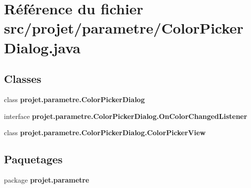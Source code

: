 \section{\-Référence du fichier src/projet/parametre/\-Color\-Picker\-Dialog.java}
\label{_color_picker_dialog_8java}
\subsection*{\-Classes}
\begin{DoxyCompactItemize}
\item 
class {\bf projet.\-parametre.\-Color\-Picker\-Dialog}
\item 
interface {\bf projet.\-parametre.\-Color\-Picker\-Dialog.\-On\-Color\-Changed\-Listener}
\item 
class {\bf projet.\-parametre.\-Color\-Picker\-Dialog.\-Color\-Picker\-View}
\end{DoxyCompactItemize}
\subsection*{\-Paquetages}
\begin{DoxyCompactItemize}
\item 
package {\bf projet.\-parametre}
\end{DoxyCompactItemize}
